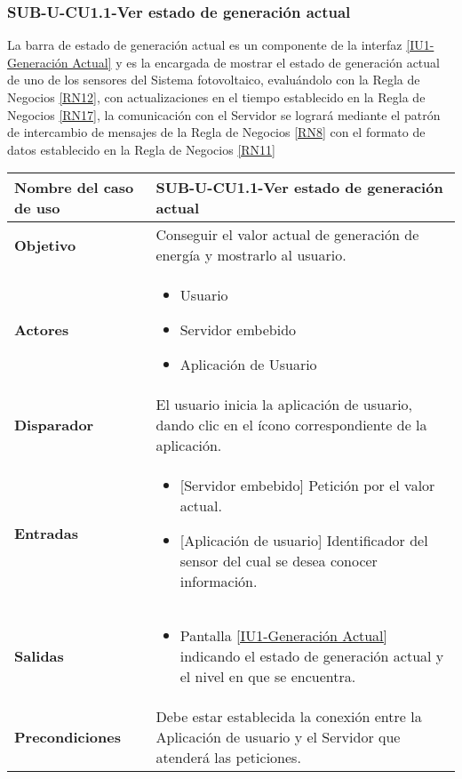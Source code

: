 \subsubsection{SUB-U-CU1.1-Ver estado de generación actual}\label{SUB-U-CU1.1}
La barra de estado de generación actual es un componente de la interfaz \hyperref[fig:monitoreo]{[IU1-Generación Actual]} y es la encargada de mostrar el estado de generación actual de uno de los sensores del Sistema fotovoltaico, evaluándolo con la Regla de Negocios \ref{RN12}, con actualizaciones en el tiempo establecido en la Regla de Negocios \ref{RN17}, la comunicación con el Servidor se logrará mediante el patrón de intercambio de mensajes de la Regla de Negocios \ref{RN8} con el formato de datos establecido en la Regla de Negocios \ref{RN11}   
\begin{longtable}{|J{5cm}|J{10.3cm}|}
	\hline
	\textbf{Nombre del caso de uso} &
		SUB-U-CU1.1-Ver estado de generación actual \\ \hline
	\textbf{Objetivo} &
		Conseguir el valor actual de generación de energía y mostrarlo al usuario. \\ \hline
	\textbf{Actores} &
		\begin{itemize}
		    \item Usuario
			\item Servidor embebido
			\item Aplicación de Usuario
		\end{itemize} \\ \hline
	\textbf{Disparador} & 
	    El usuario inicia la aplicación de usuario, dando clic en el ícono correspondiente de la aplicación.\\ \hline 
	\textbf{Entradas} & 
		\begin{itemize}
				\item{[Servidor embebido]} Petición por el valor actual.
				\item{[Aplicación de usuario]} Identificador del sensor del cual se desea conocer información.
		\end{itemize}\\ \hline 
	\textbf{Salidas} & 
		\begin{itemize}
			\item Pantalla \hyperref[fig:monitoreo]{[IU1-Generación Actual]} indicando el estado de generación actual y el nivel en que se encuentra.
		\end{itemize} \\ \hline
	\textbf{Precondiciones} &
		Debe estar establecida la conexión entre la Aplicación de usuario y el Servidor que atenderá las peticiones. \\ \hline

\end{longtable}
